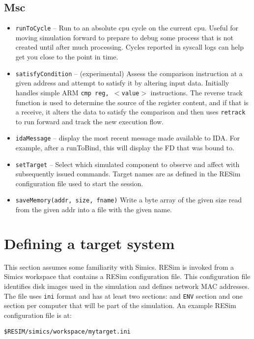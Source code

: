 \documentclass[titlepage]{article}
\begin{document}
\subsection{Msc}
\begin{itemize}
\item{\tt runToCycle} -- Run to an absolute cpu cycle on the current cpu.  Useful for moving simulation forward to prepare to debug some process
that is not created until after much processing.  Cycles reported in syscall logs can help get you close to the point in time.

\item{\tt satisfyCondition} -- (experimental) Assess the comparison instruction at a given address and attempt to satisfy it by altering input data.  
Initially handles simple ARM {\tt cmp reg, $<$value$>$} instructions.  The 
reverse track function is used to determine the source of the register content, and if that is a receive, it alters the data to satisfy the
comparison and then uses {\tt retrack} to run forward and track the new execution flow.

\item{\tt idaMessage} -- display the most recent message made available to IDA.  For example, after a runToBind, this will display the FD that was bound to.
\item {\tt setTarget} -- Select which simulated component to observe and affect with subsequently issued commands.  Target names are as defined in the
RESim configuration file used to start the session.

\item {\tt saveMemory(addr, size, fname)} Write a byte array of the given size read from the given addr into a file with the given name.

\end{itemize}

\section{Defining a target system}
\label{configuration}
This section assumes some familiarity with Simics.  RESim is invoked from a Simics workspace that contains a RESim configuration file.
This configuration file identifies disk images used in the simulation and defines network MAC addresses.  
The file uses {\tt ini} format and has at least two sections: and {\tt ENV} section and one section per computer that will be part
of the simulation.  An example RESim configuration file is at:
\begin{verbatim}
$RESIM/simics/workspace/mytarget.ini
\end{verbatim}
\end{document}
